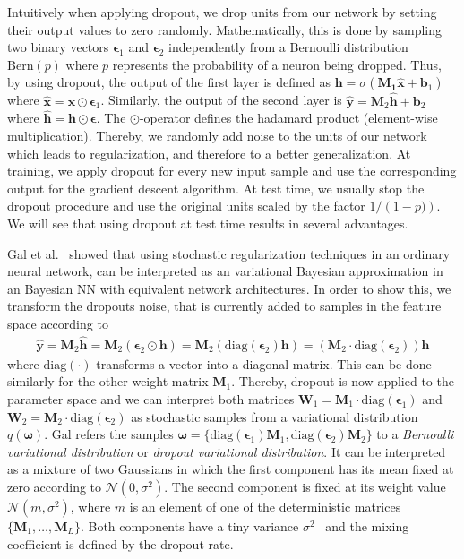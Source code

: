 \documentclass[runningheads]{llncs}
\begin{document}
Intuitively when applying dropout, we drop units from our network by setting their output values to zero randomly.
Mathematically, this is done by sampling two binary vectors $\boldsymbol{\epsilon}_1$ and $\boldsymbol{\epsilon}_2$ independently from a Bernoulli distribution $\mathrm{Bern}(p)$ where $p$ represents the probability of a neuron being dropped.
Thus, by using dropout, the output of the first layer is defined as $\mathbf{h} = \sigma\left( \mathbf{M_1}\hat{\mathbf{x}} + \mathbf{b}_1\right)$ where $\hat{\mathbf{x}} = \mathbf{x} \odot \boldsymbol{\epsilon}_1$.
Similarly, the output of the second layer is $\hat{\mathbf{y}} = \mathbf{M}_2\hat{\mathbf{h}} + \mathbf{b}_2$ where $\hat{\mathbf{h}} = \mathbf{h} \odot \boldsymbol{\epsilon}$.
The $\odot$-operator defines the hadamard product (element-wise multiplication).
Thereby, we randomly add noise to the units of our network which leads to regularization, and therefore to a better generalization.
At training, we apply dropout for every new input sample and use the corresponding output for the gradient descent algorithm.
At test time, we usually stop the dropout procedure and use the original units scaled by the factor $1 / \left(1 - p)\right)$. 
We will see that using dropout at test time results in several advantages.

Gal et al.~\cite{Gal2016Uncertainty} showed that using stochastic regularization techniques in an ordinary neural network, can be interpreted as an variational Bayesian approximation in an Bayesian NN with equivalent network architectures.
In order to show this, we transform the dropouts noise, that is currently added to samples in the feature space according to 
\begin{align*}
    \hat{\mathbf{y}} = \mathbf{M}_2\hat{\mathbf{h}} 
    = \mathbf{M}_2 \left( \boldsymbol{\epsilon}_2 \odot \mathbf{h}   \right) 
    = \mathbf{M}_2 \left( \mathrm{diag}\left(\boldsymbol{\epsilon}_2\right) \mathbf{h}   \right) 
    = \left(\mathbf{M}_2  \cdot\mathrm{diag}\left(\boldsymbol{\epsilon}_2\right)\right) \mathbf{h}    
\end{align*}
where $\mathrm{diag}(\cdot)$ transforms a vector into a diagonal matrix.
This can be done similarly for the other weight matrix $\mathbf{M}_1$. 
Thereby, dropout is now applied to the parameter space and we can interpret both matrices $\mathbf{W}_1 = \mathbf{M}_1  \cdot\mathrm{diag}\left(\boldsymbol{\epsilon}_1\right)$ and $\mathbf{W}_2 = \mathbf{M}_2  \cdot\mathrm{diag}\left(\boldsymbol{\epsilon}_2\right)$ as stochastic samples from a variational distribution $q(\boldsymbol{\omega})$.
Gal refers the samples $\boldsymbol{\omega} = \{\mathrm{diag}(\boldsymbol{\epsilon}_1)\mathbf{M}_1,\mathrm{diag}( \boldsymbol{\epsilon}_2)\mathbf{M}_2 \}$ to a \textit{Bernoulli variational distribution} or \textit{dropout variational distribution}.
It can be interpreted as a mixture of two Gaussians in which the first component has its mean fixed at zero according to $\mathcal{N}(0, \sigma^2)$. The second component is fixed at its weight value $\mathcal{N}(m,\sigma^2)$, where $m$ is an element of one of the deterministic matrices $\{\mathbf{M}_1, \dots, \mathbf{M}_L\}$.
Both components have a tiny variance $\sigma^2$~\cite{Gal2015Bayesian} and the mixing coefficient is defined by the dropout rate.
\end{document}
